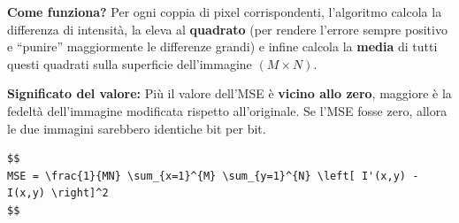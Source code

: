\textbf{Come funziona?} Per ogni coppia di pixel corrispondenti,
l'algoritmo calcola la differenza di intensità, la eleva al
\textbf{quadrato} (per rendere l'errore sempre positivo e ``punire''
maggiormente le differenze grandi) e infine calcola la \textbf{media} di
tutti questi quadrati sulla superficie dell'immagine \((M \times N)\).

\textbf{Significato del valore:} Più il valore dell'MSE è \textbf{vicino
allo zero}, maggiore è la fedeltà dell'immagine modificata rispetto
all'originale. Se l'MSE fosse zero, allora le due immagini sarebbero
identiche bit per bit.

\begin{verbatim}
$$
MSE = \frac{1}{MN} \sum_{x=1}^{M} \sum_{y=1}^{N} \left[ I'(x,y) - I(x,y) \right]^2
$$
\end{verbatim}


